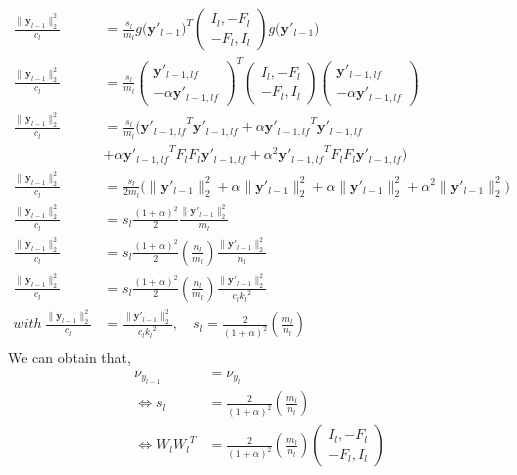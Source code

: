\documentclass[]{article}
\begin{document}
\begin{align}
\frac{\|\mathbf{y}_{l-1}\|^{2}_{2}}{c_l}&=\frac{s_l}{m_l}{g\big(\mathbf{y}'_{l-1}\big)}^{T}\begin{pmatrix} I_l, -F_l \\ -F_l,  I_l \end{pmatrix}g\big(\mathbf{y}'_{l-1}\big) \\
\frac{\|\mathbf{y}_{l-1}\|^{2}_{2}}{c_l}&=\frac{s_l}{m_l}{\begin{pmatrix} \mathbf{y}'_{l-1,lf} \\ -\alpha\mathbf{y}'_{l-1,lf} \end{pmatrix}}^{T}\begin{pmatrix} I_l, -F_l \\ -F_l,  I_l \end{pmatrix}\begin{pmatrix} \mathbf{y}'_{l-1,lf} \\ -\alpha\mathbf{y}'_{l-1,lf} \end{pmatrix} \\
\frac{\|\mathbf{y}_{l-1}\|^{2}_{2}}{c_l}&=\frac{s_l}{m_l} \big({\mathbf{y}'_{l-1,lf}}^{T} \mathbf{y}'_{l-1,lf}+\alpha{\mathbf{y}'_{l-1,lf}}^{T}\mathbf{y}'_{l-1,lf}                 \\ &+\alpha{\mathbf{y}'_{l-1,lf}}^{T}F_{l}F_{l}\mathbf{y}'_{l-1,lf}+{\alpha}^{2}{\mathbf{y}'_{l-1,lf}}^{T}F_{l}F_{l}\mathbf{y}'_{l-1,lf}\big) \\
\frac{\|\mathbf{y}_{l-1}\|^{2}_{2}}{c_l}&=\frac{s_l}{2m_l} \big( \|\mathbf{y}'_{l-1}\|_2^2+\alpha \|\mathbf{y}'_{l-1}\|_2^2+\alpha \|\mathbf{y}'_{l-1}\|_2^2+{\alpha}^{2} \|\mathbf{y}'_{l-1}\|_2^2 \big) \\
\frac{\|\mathbf{y}_{l-1}\|^{2}_{2}}{c_l}&=s_l\frac{(1+\alpha)^2}{2}\frac{\|\mathbf{y}'_{l-1}\|_2^2}{m_l}\\
\frac{\|\mathbf{y}_{l-1}\|^{2}_{2}}{c_l}&=s_l\frac{(1+\alpha)^2}{2}(\frac{n_l}{m_l})\frac{\|\mathbf{y}'_{l-1}\|_2^2}{n_l}\\
\frac{\|\mathbf{y}_{l-1}\|^{2}_{2}}{c_l}&=s_l\frac{(1+\alpha)^2}{2}(\frac{n_l}{m_l})\frac{\|\mathbf{y}'_{l-1}\|_2^2}{{c_l}{k_l}^2}\\
with\ \frac{\|\mathbf{y}_{l-1}\|^{2}_{2}}{c_l}&=\frac{\|\mathbf{y}'_{l-1}\|_2^2}{{c_l}{k_l}^2}, \quad s_l=\frac{2}{(1+\alpha)^2}(\frac{m_l}{n_l}) \\
\end{align}
We can obtain that,
\begin{align}
\nu_{y_{l-1}}&=\nu_{y_{l}} \\
\Leftrightarrow s_l&=\frac{2}{(1+\alpha)^2}(\frac{m_l}{n_l}) \\
\Leftrightarrow {W_l}{W_l}^{T}&=\frac{2}{(1+\alpha)^2}(\frac{m_l}{n_l})\begin{pmatrix} I_l, -F_l \\ -F_l,  I_l \end{pmatrix}  \\
\end{align}
\end{document}
